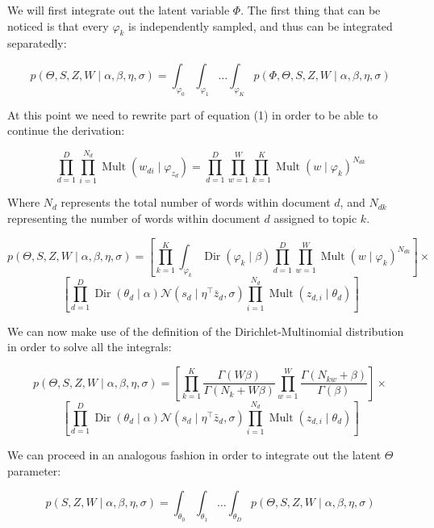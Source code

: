 \documentclass[a4paper,10pt]{article}
\DeclareMathOperator{\Dir}{Dir}
\DeclareMathOperator{\Mult}{Mult}
\renewcommand{\phi}{\varphi}
\begin{document}
We will first integrate out the latent variable $\Phi$. The first thing that can be noticed is that every $\varphi_k$ is independently sampled, and thus can be integrated separatedly:

\begin{equation}
p(\Theta, S, Z, W \mid \alpha, \beta, \eta, \sigma) = \int_{\phi_0}\int_{\phi_1}\dots \int_{\phi_K} p(\Phi, \Theta, S, Z, W \mid \alpha, \beta, \eta, \sigma)
\end{equation}

At this point we need to rewrite part of equation (1) in order to be able to continue the derivation:

\begin{equation}
\prod_{d = 1}^D \prod_{i = 1}^{N_d} \Mult(w_{di} \mid \phi_{z_d}) = \prod_{d = 1}^D \prod_{w = 1}^W \prod_{k = 1}^K \Mult(w \mid \phi_k)^{N_{dk}}
\end{equation}

Where $N_d$ represents the total number of words within document $d$, and $N_{dk}$ representing the number of words within document $d$ assigned to topic $k$.

\[p(\Theta, S, Z, W \mid \alpha, \beta, \eta, \sigma) = \left[ \prod_{k = 1}^K \int_{\phi_k} \Dir(\phi_k \mid \beta) \prod_{d = 1}^D \prod_{w = 1}^W \Mult(w \mid \phi_k)^{N_{dk}} \right] \times \]
\begin{equation}
\left[ \prod_{d = 1}^D \Dir(\theta_d \mid \alpha) \mathcal{N}(s_d \mid \eta^\top \bar{z}_d, \sigma) \prod_{i = 1}^{N_d} \Mult(z_{d, i} \mid \theta_d) \right]
\end{equation}

We can now make use of the definition of the Dirichlet-Multinomial distribution in order to solve all the integrals:

\[p(\Theta, S, Z, W \mid \alpha, \beta, \eta, \sigma) = \left[ \prod_{k = 1}^K \frac{ \Gamma(W\beta)}{\Gamma(N_k + W\beta)} \prod_{w = 1}^W \frac{\Gamma(N_{kw}+\beta)}{\Gamma(\beta)}\right] \times \]
\begin{equation}
\left[ \prod_{d = 1}^D \Dir(\theta_d \mid \alpha) \mathcal{N}(s_d \mid \eta^\top \bar{z}_d, \sigma) \prod_{i = 1}^{N_d} \Mult(z_{d, i} \mid \theta_d) \right]
\end{equation}

We can proceed in an analogous fashion in order to integrate out the latent $\Theta$ parameter:

\begin{equation}
p(S, Z, W \mid \alpha, \beta, \eta, \sigma) = \int_{\theta_0}\int_{\theta_1}\dots \int_{\theta_D} p(\Theta, S, Z, W \mid \alpha, \beta, \eta, \sigma)
\end{equation}
\end{document}
